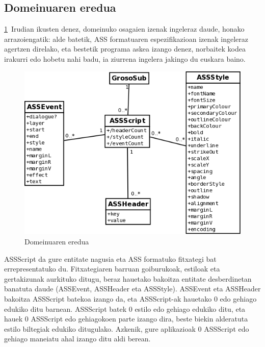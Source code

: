 \subsection{Domeinuaren eredua}
\ref{de}~Irudian ikusten denez, domeinuko osagaien izenak ingeleraz daude, honako arrazoiengatik: alde batetik, ASS formatuaren espezifikazioan izenak ingeleraz agertzen direlako\cite{gu:ass}, eta bestetik programa askea izango denez, norbaitek kodea irakurri edo hobetu nahi badu, ia ziurrena ingelera jakingo du euskara baino.
\begin{figure}[htp]
\begin{center}
\includegraphics[scale=0.35]{Pictures/Chapter4/Analisia/DE.png}
\caption{Domeinuaren eredua}
\label{de}
\end{center}
\end{figure}

ASSScript da gure entitate nagusia eta ASS formatuko fitxategi bat errepresentatuko du. Fitxategiaren barruan goiburukoak, estiloak eta gertakizunak aurkituko ditugu, beraz hauetako bakoitza entitate desberdinetan banatuta daude (ASSEvent, ASSHeader eta ASSStyle). ASSEvent eta ASSHeader bakoitza ASSScript batekoa izango da, eta ASSScript-ak hauetako 0 edo gehiago edukiko ditu barnean. ASSScript batek 0 estilo edo gehiago edukiko ditu, eta hauek 0 ASSScript edo gehiagokoen parte izango dira, beste biekin alderatuta estilo biltegiak edukiko ditugulako. Azkenik, gure aplikazioak 0 ASSScript edo gehiago maneiatu ahal izango ditu aldi berean.

